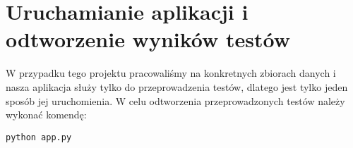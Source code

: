 \section{Uruchamianie aplikacji i odtworzenie wyników testów}
W przypadku tego projektu pracowaliśmy na konkretnych zbiorach danych i nasza aplikacja służy tylko do przeprowadzenia testów, dlatego jest tylko jeden sposób jej uruchomienia.
W celu odtworzenia przeprowadzonych testów należy wykonać komendę:
\begin{verbatim}
python app.py
\end{verbatim}